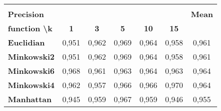 \documentclass[a4paper,11pt]{report}
\begin{document}
\begin{table}[]
\begin{center}
\begin{tabular}{lcccccc}
                                                                                                                                                                                                                                           & \multicolumn{1}{l}{}            & \multicolumn{1}{l}{}            & \multicolumn{1}{l}{}            & \multicolumn{1}{l}{}             & \multicolumn{1}{l}{}             & \multicolumn{1}{l}{}              \\
      \multicolumn{6}{l}{\textbf{Precision}}                                                                                                                                                                                               & \multicolumn{1}{l}{\textbf{Mean}} \\ \cline{1-6}
      \multicolumn{1}{|l|}{\textbf{function \textbackslash k}} & \multicolumn{1}{c|}{\textbf{1}} & \multicolumn{1}{c|}{\textbf{3}} & \multicolumn{1}{c|}{\textbf{5}} & \multicolumn{1}{c|}{\textbf{10}} & \multicolumn{1}{c|}{\textbf{15}} &                                   \\ \hline
      \multicolumn{1}{|l|}{\textbf{Euclidian}}                 & \multicolumn{1}{c|}{0,951}      & \multicolumn{1}{c|}{0,962}      & \multicolumn{1}{c|}{0,969}      & \multicolumn{1}{c|}{0,964}       & \multicolumn{1}{c|}{0,958}       & \multicolumn{1}{c|}{0,961}        \\ \hline
      \multicolumn{1}{|l|}{\textbf{Minkowski2}}                & \multicolumn{1}{c|}{0,951}      & \multicolumn{1}{c|}{0,962}      & \multicolumn{1}{c|}{0,969}      & \multicolumn{1}{c|}{0,964}       & \multicolumn{1}{c|}{0,958}       & \multicolumn{1}{c|}{0,961}        \\ \hline
      \multicolumn{1}{|l|}{\textbf{Minkowski6}}                & \multicolumn{1}{c|}{0,968}      & \multicolumn{1}{c|}{0,961}      & \multicolumn{1}{c|}{0,963}      & \multicolumn{1}{c|}{0,964}       & \multicolumn{1}{c|}{0,963}       & \multicolumn{1}{c|}{0,964}        \\ \hline
      \multicolumn{1}{|l|}{\textbf{Minkowski4}}                & \multicolumn{1}{c|}{0,962}      & \multicolumn{1}{c|}{0,957}      & \multicolumn{1}{c|}{0,966}      & \multicolumn{1}{c|}{0,966}       & \multicolumn{1}{c|}{0,970}       & \multicolumn{1}{c|}{0,964}        \\ \hline
      \multicolumn{1}{|l|}{\textbf{Manhattan}}                 & \multicolumn{1}{c|}{0,945}      & \multicolumn{1}{c|}{0,959}      & \multicolumn{1}{c|}{0,967}      & \multicolumn{1}{c|}{0,959}       & \multicolumn{1}{c|}{0,946}       & \multicolumn{1}{c|}{0,955}        \\ \hline

\end{tabular}
\end{center}
\end{table}
\end{document}
